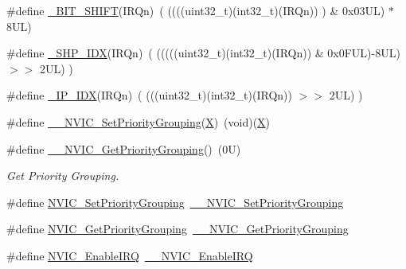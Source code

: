 \begin{DoxyCompactItemize}
\item 
\#define \hyperlink{group___c_m_s_i_s___core___n_v_i_c_functions_ga53c75b28823441c6153269f0ecbed878}{\+\_\+\+B\+I\+T\+\_\+\+S\+H\+I\+FT}(I\+R\+Qn)~(  ((((uint32\+\_\+t)(int32\+\_\+t)(I\+R\+Qn))         )      \&  0x03\+U\+L) $\ast$ 8\+U\+L)
\item 
\#define \hyperlink{group___c_m_s_i_s___core___n_v_i_c_functions_gaee4f7eb5d7e770ad51489dbceabb1755}{\+\_\+\+S\+H\+P\+\_\+\+I\+DX}(I\+R\+Qn)~( (((((uint32\+\_\+t)(int32\+\_\+t)(I\+R\+Qn)) \& 0x0\+F\+U\+L)-\/8\+U\+L) $>$$>$    2\+U\+L)      )
\item 
\#define \hyperlink{group___c_m_s_i_s___core___n_v_i_c_functions_ga370ec4b1751a6a889d849747df3763a9}{\+\_\+\+I\+P\+\_\+\+I\+DX}(I\+R\+Qn)~(   (((uint32\+\_\+t)(int32\+\_\+t)(I\+R\+Qn))                $>$$>$    2\+U\+L)      )
\item 
\#define \hyperlink{group___c_m_s_i_s___core___n_v_i_c_functions_ga6834dd8c9c59394f1b544b57665293a4}{\+\_\+\+\_\+\+N\+V\+I\+C\+\_\+\+Set\+Priority\+Grouping}(\hyperlink{main_8c_aa6aba27bc1a89db9e350b50bbf881f57}{X})~(void)(\hyperlink{main_8c_aa6aba27bc1a89db9e350b50bbf881f57}{X})
\item 
\#define \hyperlink{group___c_m_s_i_s___core___n_v_i_c_functions_gae1de06155d072758b3453edb07d12459}{\+\_\+\+\_\+\+N\+V\+I\+C\+\_\+\+Get\+Priority\+Grouping}()~(0\+U)
\begin{DoxyCompactList}\small\item\em Get Priority Grouping. \end{DoxyCompactList}\item 
\#define \hyperlink{group___c_m_s_i_s___core___n_v_i_c_functions_ga0e798d5aec68cdd8263db86a76df788f}{N\+V\+I\+C\+\_\+\+Set\+Priority\+Grouping}~\hyperlink{group___c_m_s_i_s___core___n_v_i_c_functions_gafc94dcbaee03e4746ade1f5bb9aaa56d}{\+\_\+\+\_\+\+N\+V\+I\+C\+\_\+\+Set\+Priority\+Grouping}
\item 
\#define \hyperlink{group___c_m_s_i_s___core___n_v_i_c_functions_ga4eeb9214f2264fc23c34ad5de2d3fa11}{N\+V\+I\+C\+\_\+\+Get\+Priority\+Grouping}~\hyperlink{group___c_m_s_i_s___core___n_v_i_c_functions_ga9b894af672df4373eb637f8288845c05}{\+\_\+\+\_\+\+N\+V\+I\+C\+\_\+\+Get\+Priority\+Grouping}
\item 
\#define \hyperlink{group___c_m_s_i_s___core___n_v_i_c_functions_ga57b3064413dbc7459d9646020fdd8bef}{N\+V\+I\+C\+\_\+\+Enable\+I\+RQ}~\hyperlink{group___c_m_s_i_s___core___n_v_i_c_functions_ga71227e1376cde11eda03fcb62f1b33ea}{\+\_\+\+\_\+\+N\+V\+I\+C\+\_\+\+Enable\+I\+RQ}
\item 

\end{DoxyCompactItemize}
